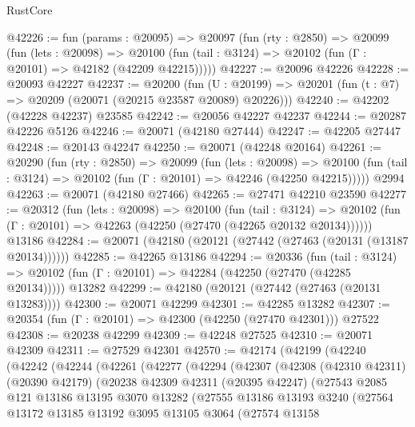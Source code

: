 \begin{lexlean}{RustCore}
\begin{coremodule}
@42226 := fun (params : @20095) =>
  @20097
    (fun (rty : @2850) =>
    @20099
      (fun (lets : @20098) =>
      @20100 (fun (tail : @3124) => @20102 (fun (Γ : @20101) => @42182 (@42209 @42215)))))
@42227 := @20096 @42226
@42228 := @20093 @42227
@42237 := @20200
    (fun (U : @20199) => @20201 (fun (t : @7) => @20209 (@20071 (@20215 @23587 @20089) @20226)))
@42240 := @42202 (@42228 @42237) @23585
@42242 := @20056 @42227 @42237
@42244 := @20287 @42226 @5126
@42246 := @20071 (@42180 @27444)
@42247 := @42205 @27447
@42248 := @20143 @42247
@42250 := @20071 (@42248 @20164)
@42261 := @20290
    (fun (rty : @2850) =>
    @20099
      (fun (lets : @20098) =>
      @20100 (fun (tail : @3124) => @20102 (fun (Γ : @20101) => @42246 (@42250 @42215)))))
    @2994
@42263 := @20071 (@42180 @27466)
@42265 := @27471 @42210 @23590
@42277 := @20312
    (fun (lets : @20098) =>
    @20100
      (fun (tail : @3124) =>
      @20102 (fun (Γ : @20101) => @42263 (@42250 (@27470 (@42265 @20132 @20134))))))
    @13186
@42284 := @20071 (@42180 (@20121 (@27442 (@27463 (@20131 (@13187 @20134))))))
@42285 := @42265 @13186
@42294 := @20336
    (fun (tail : @3124) => @20102 (fun (Γ : @20101) => @42284 (@42250 (@27470 (@42285 @20134)))))
    @13282
@42299 := @42180 (@20121 (@27442 (@27463 (@20131 @13283))))
@42300 := @20071 @42299
@42301 := @42285 @13282
@42307 := @20354 (fun (Γ : @20101) => @42300 (@42250 (@27470 @42301))) @27522
@42308 := @20238 @42299
@42309 := @42248 @27525
@42310 := @20071 @42309
@42311 := @27529 @42301
@42570 := @42174
    (@42199
      (@42240
        (@42242
          (@42244
            (@42261
              (@42277
                (@42294
                  (@42307
                    (@42308
                      (@42310 @42311)
                      (@20390 @42179)
                      (@20238
                        @42309
                        @42311
                        (@20395 @42247)
                        (@27543
                          @2085
                          @121
                          @13186
                          @13195
                          @3070
                          @13282
                          (@27555
                            @13186
                            @13193
                            @3240
                            (@27564
                              @13172
                              @13185
                              @13192
                              @3095
                              @13105
                              @3064
                              (@27574
                                @13158

\end{coremodule}
\end{lexlean}
